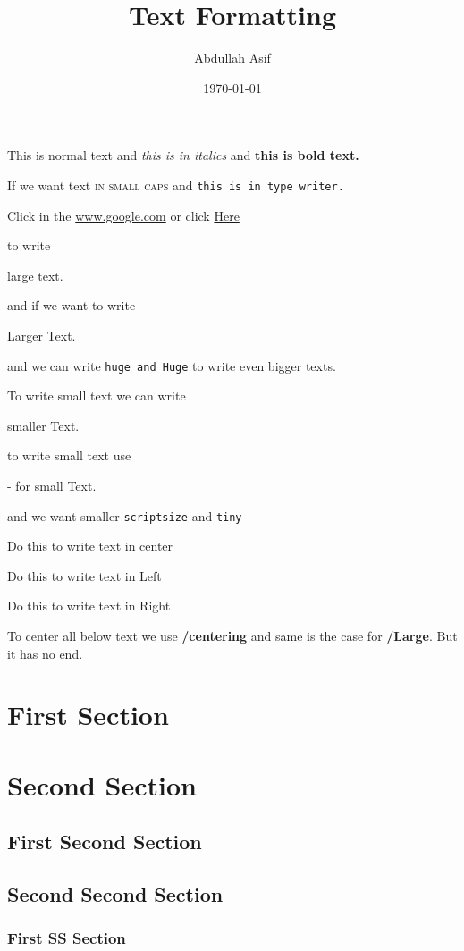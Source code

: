 \documentclass{article}
\title{Text Formatting}
\author{Abdullah Asif}
\date{\today}
\begin{document}
	
	\maketitle
	
	\tableofcontents
	\pagebreak
	
	This is normal text and \textit{this is in italics} and \textbf{this is bold text.}
	
	If we want text \textsc{in small caps} and \texttt{this is in type writer.} 
	
	Click in the \url{www.google.com} or click \href{www.google.com}{Here}
	
	\vspace{1cm}
	to write \begin{Large}
		large text.
	\end{Large}
	and if we want to write \begin{Large} Larger Text. \end{Large}
	and we can write \texttt{huge and Huge} to write even bigger texts. 
	
	To write small text we can write \begin{normalsize} smaller Text. \end{normalsize} to write small text use \begin{small} - for small Text. \end{small} and we want smaller \texttt{scriptsize} and \texttt{tiny}
	
	\vspace{1cm}
	\begin{center}
		Do this to write text in center
	\end{center}
	
		\begin{flushleft}
		Do this to write text in Left
	\end{flushleft}
	
		\begin{flushright}
		Do this to write text in Right
	\end{flushright}
	
	To center all below text we use \textbf{/centering} and same is the case for \textbf{/Large}. But it has no end. 
	
	\section*{First Section}
	\section{Second Section}
	\subsection{First Second Section}
	\subsection{Second Second Section}
	\subsubsection{First SS Section}
	
\end{document}
